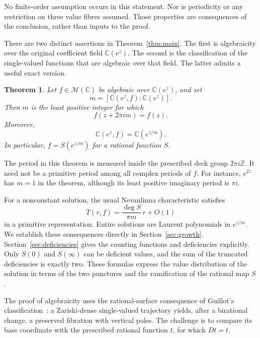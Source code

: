 \documentclass[11pt,reqno]{amsart}
\numberwithin{equation}{section}
\newtheorem{theorem}{Theorem}[section]
\theoremstyle{definition}
\theoremstyle{remark}
\newcommand{\C}{\mathbb C}
\newcommand{\Z}{\mathbb Z}
\newcommand{\MM}{\mathcal M}
\begin{document}
No finite-order assumption occurs in this statement. Nor is periodicity
or any restriction on three value fibres assumed. Those properties are
consequences of the conclusion, rather than inputs to the proof.

There are two distinct assertions in Theorem~\ref{thm:main}. The first
is algebraicity over the original coefficient field $\C(e^z)$. The
second is the classification of the single-valued functions that are
algebraic over that field. The latter admits a useful exact version.

\begin{theorem}
\label{thm:primitive-intro}
Let $f\in\MM(\C)$ be algebraic over $\C(e^z)$, and set
\[
 m=[\C(e^z,f):\C(e^z)].
\]
Then $m$ is the least positive integer for which
\begin{equation}
 f(z+2\pi i m)=f(z).
 \label{eq:primitive-period}
\end{equation}
Moreover,
\begin{equation}
 \C(e^z,f)=\C(e^{z/m}).
 \label{eq:primitive-field}
\end{equation}
In particular, $f=S(e^{z/m})$ for a rational function $S$.
\end{theorem}

The period in this theorem is measured inside the prescribed deck group
$2\pi i\Z$. It need not be a primitive period among all complex periods
of $f$. For instance, $e^{2z}$ has $m=1$ in the theorem, although its
least positive imaginary period is $\pi i$.

For a nonconstant solution, the usual Nevanlinna characteristic satisfies
\begin{equation}
 T(r,f)=\frac{\deg S}{\pi m}\,r+O(1)
 \label{eq:growth-intro}
\end{equation}
in a primitive representation. Entire solutions are Laurent polynomials
in $e^{z/m}$. We establish these consequences directly in
Section~\ref{sec:growth}.
Section~\ref{sec:deficiencies} gives the counting functions and
deficiencies explicitly. Only $S(0)$ and $S(\infty)$ can be deficient
values, and the sum of the truncated deficiencies is exactly two.
These formulas express the value distribution of the solution in
terms of the two punctures and the ramification of the rational map $S$.

The proof of algebraicity uses the rational-surface consequence of
Guillot's classification~\cite[Main Theorem]{Guillot2019}: a
Zariski-dense single-valued
trajectory yields, after a birational change, a preserved fibration with
vertical poles. The challenge is to compare its base coordinate with
the prescribed rational function $t$, for which $Dt=t$.
\end{document}
